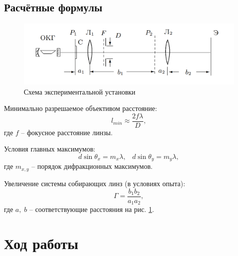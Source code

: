 \documentclass[a4paper, 12pt]{article}%
\begin{document}
	
	\subsection{Расчётные формулы}
	
	\begin{figure}[H]
		\centering
		\includegraphics[width=0.8\linewidth]{Screenshot_3}
		\caption{Схема экспериментальной установки}
		\label{fig:screenshot3}
	\end{figure}
	Минимально разрешаемое объективом расстояние:
	\begin{equation}\label{минимальное_расстояние}
		l_{min}\approx \frac{2 f \lambda}{D},
	\end{equation}
	где $ f $ -- фокусное расстояние линзы.
	
	Условия главных максимумов:
	\begin{equation}\label{условие_максимумов}
		d \sin \theta_x = m_x \lambda, \;\;\;	d \sin \theta_y = m_y \lambda,
	\end{equation}
	где $ m_{x, y} $ -- порядок дифракционных максимумов.
	
	Увеличение системы собирающих линз (в условиях опыта):
	\begin{equation}\label{увеличение}
		\Gamma = \frac{b_1 b_2}{a_1 a_2},
	\end{equation}
	где $ a, \; b $ -- соответствующие расстояния на рис. \ref{fig:screenshot3}.
	\section{Ход работы}
\end{document}

